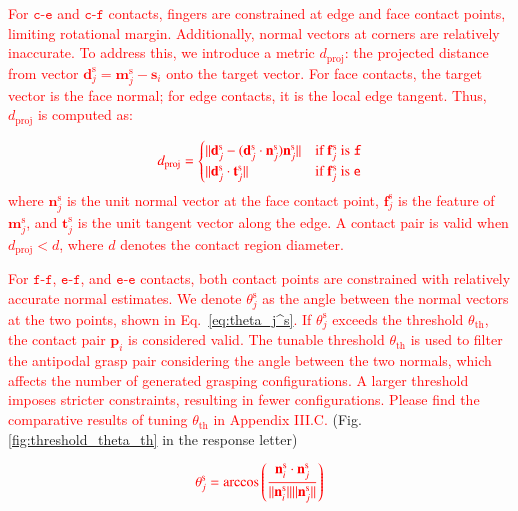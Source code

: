 \documentclass[journal]{IEEEtran}
\newcommand{\rev}[1]{\textcolor{red}{#1}}
\begin{document}
\rev{For $\mathtt{c}$-$\mathtt{e}$ and $\mathtt{c}$-$\mathtt{f}$ contacts, fingers are constrained at edge and face contact points, limiting rotational margin. Additionally, normal vectors at corners are relatively inaccurate.  
To address this, we introduce a metric $d_{\text{proj}}$: the projected distance from vector $\mathbf{d}_j^\text{s} = \mathbf{m}_j^\text{s} - \mathbf{s}_i$ onto the target vector.  
For face contacts, the target vector is the face normal; for edge contacts, it is the local edge tangent.  Thus, $d_{\text{proj}}$ is computed as:}

\begin{equation}
    \rev{d_{\text{proj}} = \begin{cases}
    \|\mathbf{d}_j^\text{s} - (\mathbf{d}_j^\text{s} \cdot \mathbf{n}_j^\text{s})\mathbf{n}_j^\text{s}\| & \text{if } \mathbf{f}_j^\text{s} \text{ is } \mathtt{f} \\
    \|\mathbf{d}_j^\text{s} \cdot \mathbf{t}_j^\text{s}\| & \text{if } \mathbf{f}_j^\text{s} \text{ is } \mathtt{e}
    \end{cases}}
    \label{eq:proj_d}
\end{equation}
\rev{where $\mathbf{n}_j^\text{s}$ is the unit normal vector at the face contact point, $\mathbf{f}_j^\text{s}$ is the feature of $\mathbf{m}_j^\text{s}$, and $\mathbf{t}_j^\text{s}$ is the unit tangent vector along the edge.  A contact pair is valid when $d_{\text{proj}} < d$, where $d$ denotes the contact region diameter.}

\rev{For $\mathtt{f}$-$\mathtt{f}$, $\mathtt{e}$-$\mathtt{f}$, and $\mathtt{e}$-$\mathtt{e}$ contacts, both contact points are constrained with relatively accurate normal estimates. We denote $\theta_j^\text{s}$ as the angle between the normal vectors at the two points, shown in Eq.~\ref{eq:theta_j^s}.
If $\theta_j^\text{s}$ exceeds the threshold $\theta_{\text{th}}$, the contact pair $\mathbf{p}_i$ is considered valid. The tunable threshold $\theta_{\text{th}}$ is used to filter the antipodal grasp pair considering the angle between the two normals, which affects the number of generated grasping configurations. A larger threshold imposes stricter constraints, resulting in fewer configurations. Please find the comparative results of tuning $\theta_{\text{th}}$ in Appendix III.C.} (Fig. \ref{fig:threshold_theta_th} in the response letter) 

\begin{equation}
    \rev{\theta_j^\text{s} = \arccos \left( \frac{\mathbf{n}_i^\text{s} \cdot \mathbf{n}_j^\text{s}}{\|\mathbf{n}_i^\text{s}\| \|\mathbf{n}_j^\text{s}\|} \right)}
    \label{eq:theta_j^s}
\end{equation}
\end{document}
